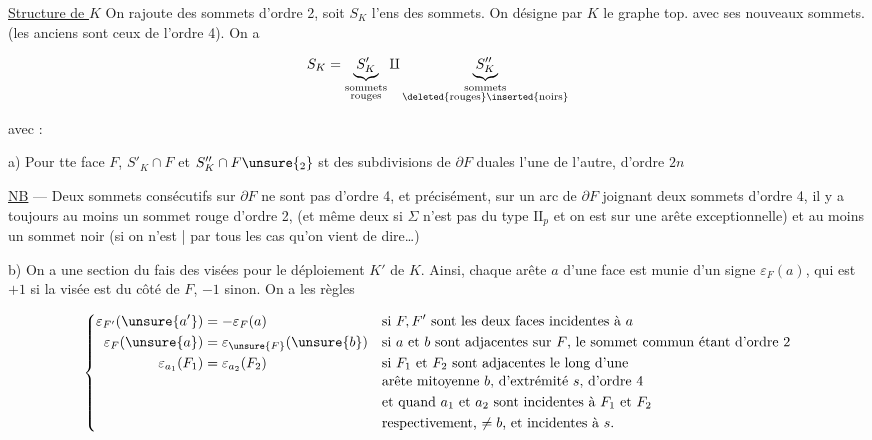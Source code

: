 \uline{Structure de $K$} On rajoute des sommets d'ordre 2, soit $S_K$ l'ens des sommets. On désigne par $K$ le graphe top. avec ses nouveaux sommets. (les anciens sont ceux de l'ordre 4). On a

\[ S_K=\underbrace{S'_K}_{\substack{\text{sommets}\\\text{rouges}}}\amalg
\underbrace{S''_K}_{\substack{\text{sommets}\\\text{\deleted{rouges}\inserted{noirs}}}} \]


avec :

a) Pour tte  face $F$, $S'_K\cap F$ et $S''_K\cap F\unsure{_2}$ st des subdivisions de $\partial F$ duales l'une de l'autre, d'ordre $2n$

 \uline{NB} --- Deux sommets consécutifs sur $\partial F$ ne sont pas d'ordre 4, et  précisément,  sur un arc de $\partial F$ joignant deux sommets d'ordre 4, il y a toujours au moins un sommet rouge d'ordre 2, (et même deux si $\Sigma$ n'est pas  du type $\mathrm{II}_p$ et on est sur une arête exceptionnelle) et au moins un sommet noir (si on n'est | par tous les cas qu'on vient de dire\ldots)

b)  On a une section du fais des visées pour le déploiement $K'$ de $K$. Ainsi, chaque arête $a$ d'une face  est munie d'un signe $\varepsilon_F(a)$, qui est \deleted{\unsure{$\pm$}}$+1$ si la visée est du côté de $F$, $-1$ sinon. On a les règles

\[
\left\{\begin{aligned}
\varepsilon_{F'}(\unsure{a'})&=-\varepsilon_F(a) &&\text{si $F,F'$ sont les deux faces incidentes à $a$}\\
\varepsilon_F(\unsure{a})&=\varepsilon_{\unsure{F}}(\unsure{b}) &&\text{si $a$ et $b$ sont adjacentes sur $F$, le sommet commun étant d'ordre 2}\\
\varepsilon_{a_1}(F_1)&=\varepsilon_{a_2}(F_2) &&\text{si $F_1$ et $F_2$ sont adjacentes le long d'une}\\[-2pt]
&&&\text{arête mitoyenne $b$, d'extrémité $s$, d'ordre 4}\\
&&&\text{et quand $a_1$ et $a_2$ sont incidentes à $F_1$ et $F_2$}\\
&&&\text{respectivement, $\ne b$, et incidentes à $s$.}
\end{aligned}\right.
\]


